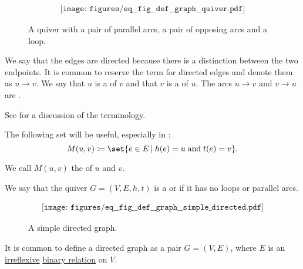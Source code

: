 \begin{definition}
\begin{thmenum}[series=def:graph]
    \begin{figure}[h]
      \begin{equation}\label{eq:fig:def:graph/quiver}
        \begin{aligned}
          \texttt{[image: figures/eq\_\_fig\_\_def\_\_graph\_\_quiver.pdf]}
        \end{aligned}
      \end{equation}
      \caption{A quiver with a pair of parallel arcs, a pair of opposing arcs and a loop.}\label{fig:def:graph/quiver}
    \end{figure}

    We say that the edges are directed because there is a distinction between the two endpoints. It is common to reserve the term  for directed edges and denote them as \( u \to v \). We say that \( u \) is a  of \( v \) and that \( v \) is a  of \( u \). The arcs \( u \to v \) and \( v \to u \) are .

    See  for a discussion of the terminology.

    The following set will be useful, especially in :
    \begin{equation}\label{eq:def:graph/quiver/arc_set}
      M(u, v) \coloneqq \set{ e \in E \given h(e) = u \T{and} t(e) = v }.
    \end{equation}

    We call \( M(u, v) \) the  of \( u \) and \( v \).

     We say that the quiver \( G = (V, E, h, t) \) is a  or  if it has no loops or parallel arcs.

    \begin{figure}[h]
      \begin{equation}\label{eq:fig:def:graph/simple_directed}
        \begin{aligned}
          \texttt{[image: figures/eq\_\_fig\_\_def\_\_graph\_\_simple\_directed.pdf]}
        \end{aligned}
      \end{equation}
      \caption{A simple directed graph.}\label{fig:def:graph/simple_directed}
    \end{figure}

    It is common to define a directed graph as a pair \( G = (V, E) \), where \( E \) is an \hyperref[def:binary_relation/irreflexive]{irreflexive} \hyperref[def:binary_relation]{binary relation} on \( V \).


\end{thmenum}
\end{definition}
